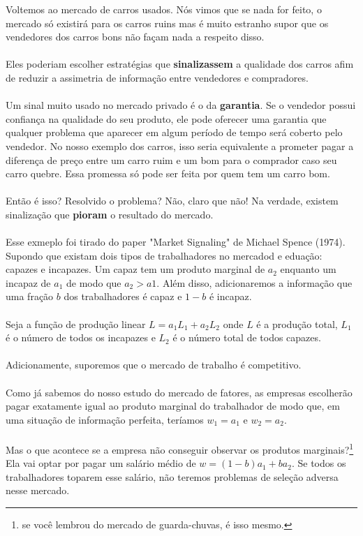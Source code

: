 \documentclass[a4paper,11pt,oneside]{book}
\theoremstyle{definition}
\theoremstyle{break}
\begin{document}
Voltemos ao mercado de carros usados. Nós vimos que se nada for feito, o mercado só existirá para os carros ruins mas é muito estranho supor que os vendedores dos carros bons não façam nada a respeito disso.
\\~\\
Eles poderiam escolher estratégias que \textbf{sinalizassem} a qualidade dos carros afim de reduzir a assimetria de informação entre vendedores e compradores.
\\~\\
Um sinal muito usado no mercado privado é o da \textbf{garantia}. Se o vendedor possui confiança na qualidade do seu produto, ele pode oferecer uma garantia que qualquer problema que aparecer em algum período de tempo será coberto pelo vendedor. No nosso exemplo dos carros, isso seria equivalente a prometer pagar a diferença de preço entre um carro ruim e um bom para o comprador caso seu carro quebre. Essa promessa só pode ser feita por quem tem um carro bom.
\\~\\
Então é isso? Resolvido o problema? Não, claro que não! Na verdade, existem sinalização que \textbf{pioram} o resultado do mercado.
\\~\\
Esse exmeplo foi tirado do paper "Market Signaling" de Michael Spence (1974). Supondo que existam dois tipos de trabalhadores no mercadod e eduação: capazes e incapazes. Um capaz tem um produto marginal de $a_2$ enquanto um incapaz de $a_1$ de modo que $a_2 > a1$. Além disso, adicionaremos a informação que uma fração $b$ dos trabalhadores é capaz e $1 - b$ é incapaz.
\\~\\
Seja a função de produção linear $L = a_1L_1 + a_2L_2$ onde $L$ é a produção total, $L_1$ é o número de todos os incapazes e $L_2$ é o número total de todos capazes.
\\~\\
Adicionamente, suporemos que o mercado de trabalho é competitivo.
\\~\\
Como já sabemos do nosso estudo do mercado de fatores, as empresas escolherão pagar exatamente igual ao produto marginal do trabalhador de modo que, em uma situação de informação perfeita, teríamos $w_1 = a_1$ e $w_2 = a_2$.
\\~\\
Mas o que acontece se a empresa não conseguir observar os produtos marginais?\footnote{se você lembrou do mercado de guarda-chuvas, é isso mesmo.} Ela vai optar por pagar um salário médio de $w = (1 - b)a_1 + ba_2$. Se todos os trabalhadores toparem esse salário, não teremos problemas de seleção adversa nesse mercado.
\end{document}
